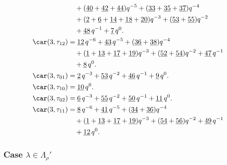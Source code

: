 \begin{align*}
	&\quad+(\underline{40}+\underline{42}+\underline{44})q^{-5}+(\underline{33}+\underline{35}+\underline{37})q^{-4}\\
	&\quad+(\underline{2}+\underline{6}+\underline{14}+\underline{18}+\underline{20})q^{-3}+(\underline{53}+\underline{55})q^{-2}\\
	&\quad+\underline{48}\,q^{-1}+\underline{7}\,q^0.\\
	\car(3,\tau_{12})
	&=\underline{12}\,q^{-6}+\underline{43}\,q^{-5}+(\underline{36}+\underline{38})q^{-4}\\
	&\quad+(\underline{1}+\underline{13}+\underline{17}+\underline{19})q^{-3}+(\underline{52}+\underline{54})q^{-2}+\underline{47}\,q^{-1}\\
	&\quad+\underline{8}\,q^0.\\
	\car(3,\tau_{01})
	&=\underline{2}\,q^{-3}+\underline{53}\,q^{-2}+\underline{46}\,q^{-1}+\underline{9}\,q^0.\\
	\car(3,\tau_{10})
	&=\underline{10}\,q^0.\\
	\car(3,\tau_{02})
	&=\underline{6}\,q^{-3}+\underline{55}\,q^{-2}+\underline{50}\,q^{-1}+\underline{11}\,q^0.\\
	\car(3,\tau_{11})
	&=\underline{8}\,q^{-6}+\underline{41}\,q^{-5}+(\underline{34}+\underline{36})q^{-4}\\
	&\quad+(\underline{1}+\underline{13}+\underline{17}+\underline{19})q^{-3}+(\underline{54}+\underline{56})q^{-2}+\underline{49}\,q^{-1}\\
	&\quad+\underline{12}\,q^0.
\end{align*}

\subsubsection{Case $\lambda\in \Lambda_\rho'$}

